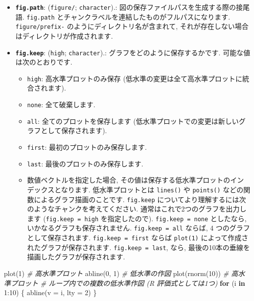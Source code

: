 \documentclass[
  11pt,
]{bxjsreport}
\newenvironment{Shaded}{\begin{snugshade}}{\end{snugshade}}
\newcommand{\AttributeTok}[1]{\textcolor[rgb]{0.77,0.63,0.00}{#1}}
\newcommand{\CommentTok}[1]{\textcolor[rgb]{0.56,0.35,0.01}{\textit{#1}}}
\newcommand{\ControlFlowTok}[1]{\textcolor[rgb]{0.13,0.29,0.53}{\textbf{#1}}}
\newcommand{\DecValTok}[1]{\textcolor[rgb]{0.00,0.00,0.81}{#1}}
\newcommand{\FunctionTok}[1]{\textcolor[rgb]{0.00,0.00,0.00}{#1}}
\newcommand{\NormalTok}[1]{#1}
\newcommand{\SpecialCharTok}[1]{\textcolor[rgb]{0.00,0.00,0.00}{#1}}
\providecommand{\tightlist}{%
  \setlength{\itemsep}{0pt}\setlength{\parskip}{0pt}}
\begin{document}
\begin{itemize}
\tightlist
\item
  \textbf{\texttt{fig.path}}: (\texttt{\textquotesingle{}figure/\textquotesingle{}}; \texttt{character}).: 図の保存ファイルパスを生成する際の接尾語. \texttt{fig.path} とチャンクラベルを連結したものがフルパスになります. \texttt{figure/prefix-} のようにディレクトリ名が含まれて, それが存在しない場合はディレクトリが作成されます.
\item
  \textbf{\texttt{fig.keep}}: (\texttt{\textquotesingle{}high\textquotesingle{}}; \texttt{character}).: グラフをどのように保存するかです. 可能な値は次のとおりです.

  \begin{itemize}
  \tightlist
  \item
    \texttt{high}: 高水準プロットのみ保存 (低水準の変更は全て高水準プロットに統合されます).
  \item
    \texttt{none}: 全て破棄します.
  \item
    \texttt{all}: 全てのプロットを保存します (低水準プロットでの変更は新しいグラフとして保存されます).
  \item
    \texttt{first}: 最初のプロットのみ保存します.
  \item
    \texttt{last}: 最後のプロットのみ保存します.
  \item
    数値ベクトルを指定した場合, その値は保存する低水準プロットのインデックスとなります. 低水準プロットとは \texttt{lines()} や \texttt{points()} などの関数によるグラフ描画のことです. \texttt{fig.keep} についてより理解するには次のようなチャンクを考えてください. 通常はこれで2つのグラフを出力します (\texttt{fig.keep = \textquotesingle{}high\textquotesingle{}} を指定したので). \texttt{fig.keep = \textquotesingle{}none\textquotesingle{}} としたなら, いかなるグラフも保存されません. \texttt{fig.keep = \textquotesingle{}all\textquotesingle{}} ならば, 4 つのグラフとして保存されます. \texttt{fig.keep = \textquotesingle{}first\textquotesingle{}} ならば \texttt{plot(1)} によって作成されたグラフが保存されます. \texttt{fig.keep = \textquotesingle{}last\textquotesingle{}}, なら, 最後の10本の垂線を描画したグラフが保存されます.
  \end{itemize}
\end{itemize}

\begin{Shaded}
\begin{Highlighting}[numbers=left,,]
\FunctionTok{plot}\NormalTok{(}\DecValTok{1}\NormalTok{)  }\CommentTok{\# 高水準プロット}
\FunctionTok{abline}\NormalTok{(}\DecValTok{0}\NormalTok{, }\DecValTok{1}\NormalTok{)  }\CommentTok{\# 低水準の作図}
\FunctionTok{plot}\NormalTok{(}\FunctionTok{rnorm}\NormalTok{(}\DecValTok{10}\NormalTok{))  }\CommentTok{\# 高水準プロット}
\CommentTok{\# ループ内での複数の低水準作図 (R 評価式としては1つ)}
\ControlFlowTok{for}\NormalTok{ (i }\ControlFlowTok{in} \DecValTok{1}\SpecialCharTok{:}\DecValTok{10}\NormalTok{) \{}
  \FunctionTok{abline}\NormalTok{(}\AttributeTok{v =}\NormalTok{ i, }\AttributeTok{lty =} \DecValTok{2}\NormalTok{)}
\NormalTok{\}}
\end{Highlighting}
\end{Shaded}
\end{document}
